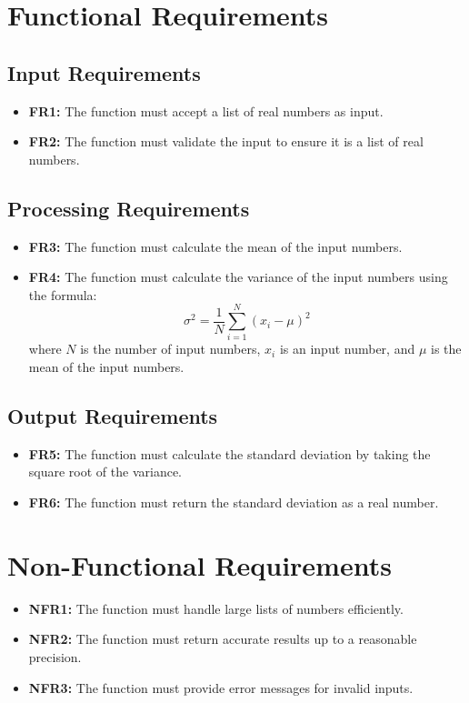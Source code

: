 \documentclass{article}
\begin{document}
\section{Functional Requirements}

\subsection{Input Requirements}
\begin{itemize}
\item \textbf{FR1:} The function must accept a list of real numbers as input.
\item \textbf{FR2:} The function must validate the input to ensure it is a list of real numbers.
\end{itemize}

\subsection{Processing Requirements}
\begin{itemize}
\item \textbf{FR3:} The function must calculate the mean of the input numbers.
\item \textbf{FR4:} The function must calculate the variance of the input numbers using the formula:
\[
\sigma^2 = \frac{1}{N}\sum_{i=1}^{N}(x_i - \mu)^2
\]
where $N$ is the number of input numbers, $x_i$ is an input number, and $\mu$ is the mean of the input numbers.
\end{itemize}

\subsection{Output Requirements}
\begin{itemize}
\item \textbf{FR5:} The function must calculate the standard deviation by taking the square root of the variance.
\item \textbf{FR6:} The function must return the standard deviation as a real number.
\end{itemize}

\section{Non-Functional Requirements}

\begin{itemize}
\item \textbf{NFR1:} The function must handle large lists of numbers efficiently.
\item \textbf{NFR2:} The function must return accurate results up to a reasonable precision.
\item \textbf{NFR3:} The function must provide error messages for invalid inputs.
\end{itemize}
\end{document}

